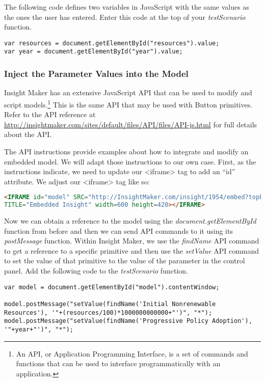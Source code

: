 \documentclass[]{memoir}
\begin{document}
The following code defines two variables in JavaScript with the same
values as the ones the user has entered. Enter this code at the top of
your \emph{testScenario} function.

\begin{lstlisting}
var resources = document.getElementById("resources").value;
var year = document.getElementById("year").value;
\end{lstlisting}

\subsubsection{Inject the Parameter Values into the Model}

Insight Maker has an extensive JavaScript API that can be used to modify
and script models.\footnote{An API, or Application Programming
  Interface, is a set of commands and functions that can be used to
  interface programmatically with an application.} This is the same API
that may be used with Button primitives. Refer to the API reference at
\url{http://insightmaker.com/sites/default/files/API/files/API-js.html}
for full details about the API.

The API instructions provide examples about how to integrate and modify
an embedded model. We will adapt those instructions to our own case.
First, as the instructions indicate, we need to update our
\textless{}iframe\textgreater{} tag to add an ``id'' attribute. We
adjust our \textless{}iframe\textgreater{} tag like so:

\begin{lstlisting}[language=HTML]
<IFRAME id="model" SRC="http://InsightMaker.com/insight/1954/embed?topBar=1&sideBar=1&zoom=1"
TITLE="Embedded Insight" width=600 height=420></IFRAME> 
\end{lstlisting}

Now we can obtain a reference to the model using the
\emph{document.getElementById} function from before and then we can send
API commands to it using its \emph{postMessage} function. Within Insight
Maker, we use the \emph{findName} API command to get a reference to a
specific primitive and then use the \emph{setValue} API command to set
the value of that primitive to the value of the parameter in the control
panel. Add the following code to the \emph{testScenario} function.

\begin{lstlisting}
var model = document.getElementById("model").contentWindow;

model.postMessage("setValue(findName('Initial Nonrenewable Resources'), '"+(resources/100)*1000000000000+"')", "*");
model.postMessage("setValue(findName('Progressive Policy Adoption'), '"+year+"')", "*");
\end{lstlisting}
\end{document}

